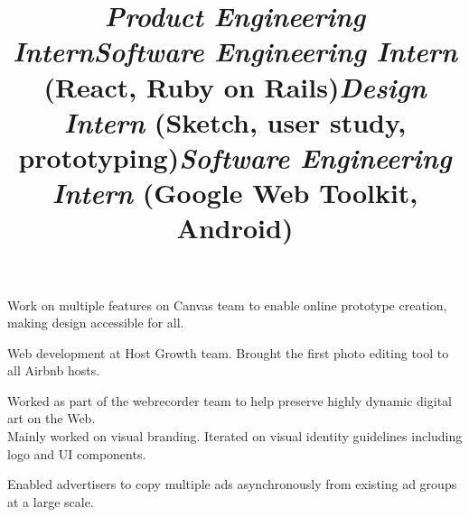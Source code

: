 \begin{resume}
\title{\textsl{Product Engineering Intern}}
\begin{position}
Work on multiple features on Canvas team to enable online prototype creation, making design accessible for all.
\end{position}

\title{\textsl{Software Engineering Intern} (React, Ruby on Rails)}
\begin{position}
Web development at Host Growth team. 
Brought the first photo editing tool to all Airbnb hosts.
\end{position}

\title{\textsl{Design Intern} (Sketch, user study, prototyping)}
\begin{position}
Worked as part of the webrecorder team to help preserve highly dynamic digital art on the Web. \\
Mainly worked on visual branding. Iterated on visual identity guidelines including logo and UI components.
\end{position}

\title{\textsl{Software Engineering Intern} (Google Web Toolkit, Android)}
\begin{position}
Enabled advertisers to copy multiple ads asynchronously from existing ad groups at a large scale.

\end{position}




\begin{formatb}
  \\
  \body\\
\end{formatb}

\section{}


\end{resume}
